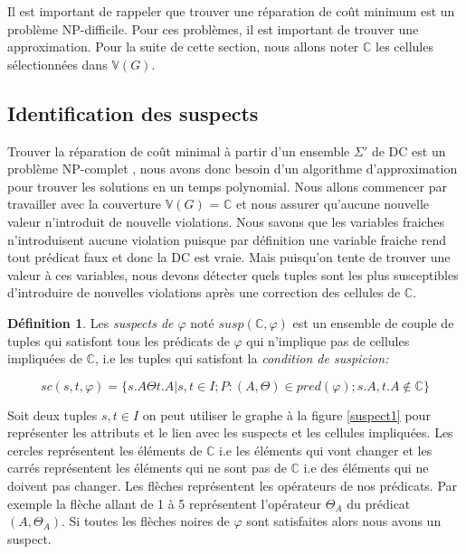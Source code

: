 \documentclass[letterpaper, 12pt]{report}
\theoremstyle{definition}
\newtheorem{mydef}{Définition}
\begin{document}
Il est important de rappeler que trouver une réparation de coût minimum est un problème NP-difficile. Pour ces problèmes, il est important de trouver une approximation. Pour la suite de cette section, nous allons noter $\mathbb{C}$ les cellules sélectionnées dans $\mathbb{V}(G)$.

\subsection{Identification des suspects}

Trouver la réparation de coût minimal à partir d'un ensemble $\Sigma'$ de DC est un problème NP-complet \cite{main}, nous avons donc besoin d'un algorithme d'approximation pour trouver les solutions en un temps polynomial. Nous allons commencer par travailler avec la couverture $\mathbb{V}(G)$ = $\mathbb{C}$ et nous assurer qu'aucune nouvelle valeur n'introduit de nouvelle violations. Nous savons que les variables fraiches n'introduisent aucune violation puisque par définition une variable fraiche rend tout prédicat faux et donc la DC est vraie. Mais puisqu'on tente de trouver une valeur à ces variables, nous devons détecter quels tuples sont les plus susceptibles d'introduire de nouvelles violations après une correction des cellules de $\mathbb{C}$.

\begin{mydef}
	Les \emph{suspects de $\varphi$} noté $susp( \mathbb{C}, \varphi)$ est un ensemble de couple de tuples qui satisfont tous les prédicats de $\varphi$ qui n'implique pas de cellules impliquées de $\mathbb{C}$, i.e les tuples qui satisfont la \emph{condition de suspicion:}

	$$ sc(s,t,\varphi) = \{ s.A \Theta t.A | s,t \in I ; P:(A,\Theta) \in pred(\varphi) ; s.A,t.A \not\in \mathbb{C} \}  $$
	 
\end{mydef}

Soit deux tuples $s,t \in I$ on peut utiliser le graphe à la figure \ref{suspect1} pour représenter les attributs et le lien avec les suspects et les cellules impliquées. Les cercles représentent les éléments de $\mathbb{C}$ i.e les éléments qui vont changer et les carrés représentent les éléments qui ne sont pas de $\mathbb{C}$ i.e des éléments qui ne doivent pas changer. Les flèches représentent les opérateurs de nos prédicats. Par exemple la flèche allant de 1 à 5 représentent l'opérateur $\Theta_A$ du prédicat $(A,\Theta_A)$. Si toutes les flèches noires de $\varphi$ sont satisfaites alors nous avons un suspect.
\end{document}
